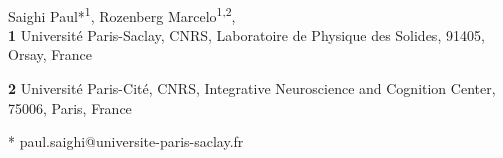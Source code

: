 \documentclass[10pt,letterpaper]{article}
\begin{document}
\vspace*{0.2in}
\begin{flushleft}
{\Large
\textbf{} %
}
\newline
\\
Saighi Paul*\textsuperscript{1},
Rozenberg Marcelo\textsuperscript{1,2},
\\
\bigskip
\textbf{1} Universit\'e Paris-Saclay, CNRS, Laboratoire de Physique des Solides, 91405, Orsay, France

\textbf{2} Universit\'e Paris-Cité, CNRS, Integrative Neuroscience and Cognition Center, 75006, Paris, France
\\
\bigskip

% 
%





* paul.saighi@universite-paris-saclay.fr

\end{flushleft}
\end{document}

